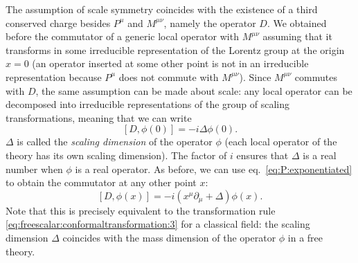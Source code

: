 \documentclass[a4paper,12pt]{article}
\numberwithin{equation}{section}
\begin{document}
The assumption of scale symmetry coincides with the existence of a third conserved charge besides $P^\mu$ and $M^{\mu\nu}$, namely the operator $D$.
We obtained before the commutator of a generic local operator with $M^{\mu\nu}$ assuming that it transforms in some irreducible representation of the Lorentz group at the origin $x = 0$
(an operator inserted at some other point is not in an irreducible representation because $P^\mu$ does not commute with $M^{\mu\nu}$).
Since $M^{\mu\nu}$ commutes with $D$, the same assumption can be made about scale: any local operator can be decomposed into 
irreducible representations of the group of scaling transformations, meaning that we can write
\begin{equation}
	\left[ D, \phi(0) \right] = -i \Delta \phi(0).
\end{equation}
$\Delta$ is called the \emph{scaling dimension} of the operator $\phi$ (each local operator of the theory has its own scaling dimension).
The factor of $i$ ensures that $\Delta$ is a real number when $\phi$ is a real operator.
As before, we can use eq.~\eqref{eq:P:exponentiated} to obtain the commutator at any other point $x$:
\begin{equation}
	\left[ D, \phi(x) \right]
	= -i \left( x^\mu \partial_\mu + \Delta \right) \phi(x).
	\label{eq:commutator:D}
\end{equation}
Note that this is precisely equivalent to the transformation rule \eqref{eq:freescalar:conformaltransformation:3} for a classical field:
the scaling dimension $\Delta$ coincides with the mass dimension of the operator $\phi$ in a free theory.
\end{document}
